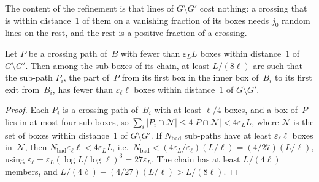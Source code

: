 \documentclass[11pt,letterpaper]{article}
\begin{document}
The content of the refinement is that lines of $G\setminus G'$ cost nothing: a crossing that is within distance~$1$ of them on a vanishing fraction of its boxes needs $j_0$ random lines on the rest, and the rest is a positive fraction of a crossing.

\begin{lemma}
\label{lem:avoidinherit}
Let $P$ be a crossing path of~$B$ with fewer than $\varepsilon_LL$ boxes within distance~$1$ of $G\setminus G'$. Then among the sub-boxes of its chain, at least $L/(8\ell)$ are such that the sub-path $P_i$, the part of~$P$ from its first box in the inner box of~$B_i$ to its first exit from~$B_i$, has fewer than $\varepsilon_\ell\ell$ boxes within distance~$1$ of $G\setminus G'$.
\end{lemma}

\begin{proof}
Each $P_i$ is a crossing path of~$B_i$ with at least $\ell/4$ boxes, and a box of~$P$ lies in at most four sub-boxes, so $\sum_i\lvert P_i\cap\mathcal N\rvert\le4\lvert P\cap\mathcal N\rvert<4\varepsilon_LL$, where $\mathcal N$ is the set of boxes within distance~$1$ of $G\setminus G'$. If $N_{\mathrm{bad}}$ sub-paths have at least $\varepsilon_\ell\ell$ boxes in~$\mathcal N$, then $N_{\mathrm{bad}}\varepsilon_\ell\ell<4\varepsilon_LL$, i.e.\ $N_{\mathrm{bad}}<(4\varepsilon_L/\varepsilon_\ell)(L/\ell)=(4/27)(L/\ell)$, using $\varepsilon_\ell=\varepsilon_L(\log L/\log\ell)^3=27\varepsilon_L$. The chain has at least $L/(4\ell)$ members, and $L/(4\ell)-(4/27)(L/\ell)>L/(8\ell)$.
\end{proof}
\end{document}
